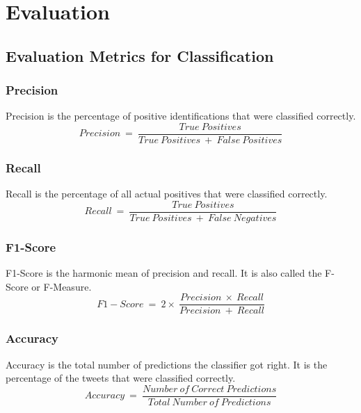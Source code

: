\section{Evaluation}

\subsection{Evaluation Metrics for Classification}

\subsubsection{Precision}
Precision is the percentage of positive identifications that were classified correctly.\newline
\begin{equation}
    Precision\ =\ \frac{True\ Positives}{True\ Positives\ +\ False\ Positives}
\end{equation}

\subsubsection{Recall}
Recall is the percentage of all actual positives that were classified correctly.
\begin{equation}
    Recall\ =\ \frac{True\ Positives}{True\ Positives\ +\ False\ Negatives}
\end{equation}

\subsubsection{F1-Score}
F1-Score is the harmonic mean of precision and recall. It is also called the F-Score or F-Measure. 
\begin{equation}
    F1-Score\ =\ 2 \times\ \frac{Precision\ \times\ Recall}{Precision\ +\ Recall}
\end{equation}

\subsubsection{Accuracy}
Accuracy is the total number of predictions the classifier got right. It is the percentage of the tweets that were classified correctly.
\begin{equation}
    Accuracy\ =\ \frac{Number\ of\ Correct\ Predictions}{Total\ Number\ of\ Predictions}
\end{equation}


